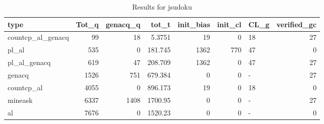 \begin{table}[ht]
\caption{Results for jsudoku}
\begin{tabular}{lrrrrrlr}
\hline
 type              &   Tot\_q &   genacq\_q &     tot\_t &   init\_bias &   init\_cl & CL\_g   &   verified\_gc \\
\hline
 countcp\_al\_genacq &      99 &         18 &    5.3751 &          19 &         0 & 18     &            27 \\
 pl\_al             &     535 &          0 &  181.745  &        1362 &       770 & 47     &             0 \\
 pl\_al\_genacq      &     619 &         47 &  208.709  &        1362 &         0 & 47     &            27 \\
 genacq            &    1526 &        751 &  679.384  &           0 &         0 & -      &            27 \\
 countcp\_al        &    4055 &          0 &  896.173  &          19 &         0 & 18     &             0 \\
 mineask           &    6337 &       1408 & 1700.95   &           0 &         0 & -      &            27 \\
 al                &    7676 &          0 & 1520.23   &           0 &         0 & -      &             0 \\
\hline
\end{tabular}
\end{table}